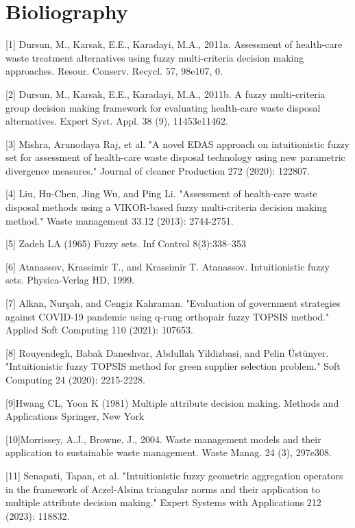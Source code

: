 \chapter{Bioliography}
\begin{flushleft}
\item{[1]} Dursun, M., Karsak, E.E., Karadayi, M.A., 2011a. Assessment of health-care waste
treatment alternatives using fuzzy multi-criteria decision making approaches.
Resour. Conserv. Recycl. 57, 98e107, 0.
\item{[2]} Dursun, M., Karsak, E.E., Karadayi, M.A., 2011b. A fuzzy multi-criteria group decision
making framework for evaluating health-care waste disposal alternatives.
Expert Syst. Appl. 38 (9), 11453e11462.
\item{[3]} Mishra, Arunodaya Raj, et al. "A novel EDAS approach on intuitionistic fuzzy set for assessment of health-care waste disposal technology using new parametric divergence measures." Journal of cleaner Production 272 (2020): 122807.
\item{[4]} Liu, Hu-Chen, Jing Wu, and Ping Li. "Assessment of health-care waste disposal methods using a VIKOR-based fuzzy multi-criteria decision making method." Waste management 33.12 (2013): 2744-2751.
\item{[5]} Zadeh LA (1965) Fuzzy sets. Inf Control 8(3):338–353
\item{[6]} Atanassov, Krassimir T., and Krassimir T. Atanassov. Intuitionistic fuzzy sets. Physica-Verlag HD, 1999.
\item{[7]} Alkan, Nurşah, and Cengiz Kahraman. "Evaluation of government strategies against COVID-19 pandemic using q-rung orthopair fuzzy TOPSIS method." Applied Soft Computing 110 (2021): 107653.
\item{[8]} Rouyendegh, Babak Daneshvar, Abdullah Yildizbasi, and Pelin Üstünyer. "Intuitionistic fuzzy TOPSIS method for green supplier selection problem." Soft Computing 24 (2020): 2215-2228.
\item{[9]}Hwang CL, Yoon K (1981) Multiple attribute decision making.
Methods and Applications Springer, New York
\item{[10]}Morrissey, A.J., Browne, J., 2004. Waste management models and their application
to sustainable waste management. Waste Manag. 24 (3), 297e308.
\item{[11]} Senapati, Tapan, et al. "Intuitionistic fuzzy geometric aggregation operators in the framework of Aczel-Alsina triangular norms and their application to multiple attribute decision making." Expert Systems with Applications 212 (2023): 118832.

\end{flushleft}
